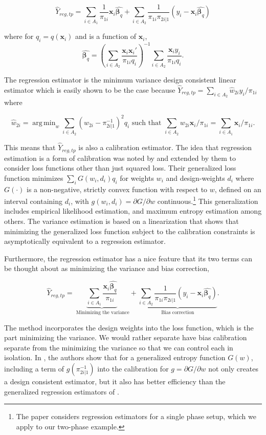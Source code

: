 \documentclass[12pt]{article}
\DeclareMathOperator*{\argmin}{arg\,min}
\renewcommand{\bf}[1]{\mathbf{#1}}
\begin{document}
$$ \hat Y_{reg, tp} 
= \sum_{i \in A_1} \frac{1}{\pi_{1i}} \bf x_i \hat{\bm \beta_q} + 
\sum_{i \in A_2} \frac{1}{\pi_{1i}\pi_{2i|1}} (y_i - \bf x_i \hat{\bm \beta_q})$$

where for $q_i = q(\bf x_i)$ and is a function of $\bf x_i$,
$$
\hat{\bm \beta_q} = \left(\sum_{i \in A_2} 
  \frac{\bf x_i \bf x_i'}{\pi_{1i} q_i}\right)^{-1} 
\sum_{i \in A_2} \frac{\bf x_i y_i}{\pi_{1i} q_i}.$$ 

The regression estimator is the minimum variance design consistent linear
estimator which is easily shown to be the case because $\hat Y_{reg, tp} =
\sum_{i \in A_2} \hat w_{2i} y_i / \pi_{1i}$ where 

$$\hat w_{2i} = \argmin_{w} \sum_{i \in A_2} (w_{2i} - \pi_{2i|1}^{-1})^2 q_i
\text{ such that } \sum_{i \in A_2} w_{2i} \bf x_i / \pi_{1i} = \sum_{i \in A_1}
\bf x_i / \pi_{1i}.$$

This means that $\hat Y_{reg, tp}$ is also a calibration estimator. The idea
that regression estimation is a form of calibration was noted by
\cite{deville1992calibration} and extended by them to consider loss functions
other than just squared loss. Their generalized loss function minimizes
$\sum_i G(w_i, d_i)q_i$ for weights $w_i$ and design-weights $d_i$ where
$G(\cdot)$ is a non-negative, strictly convex function with respect to $w$,
defined on an interval containing $d_i$, with $g(w_i, d_i) = \partial G /
\partial w$ continuous.\footnote{The \cite{deville1992calibration} paper
considers regression estimators for a single phase setup, which we apply to our
two-phase example.} This
generalization includes empirical likelihood estimation, and maximum entropy
estimation among others. The variance estimation is based on a linearization
that shows that minimizing the generalized loss function subject to the
calibration constraints is asymptotically equivalent to a regression estimator.

Furthermore, the regression estimator
has a nice feature that its two terms can be thought about as minimizing the
variance and bias correction,

$$ \hat Y_{reg, tp} 
= \underbrace{\sum_{i \in A_1} \frac{\bf x_i \hat{\bm \beta_q}}{\pi_{1i}}}_{
  \text{ Minimizing the variance}} + \underbrace{\sum_{i \in A_2}
\frac{1}{\pi_{1i}\pi_{2i|1}} (y_i - \bf x_i \hat{\bm \beta_q})}_{
\text{Bias correction}}.$$

The \cite{deville1992calibration} method incorporates the design weights into
the loss function, which is the part minimizing the variance. We would rather
separate have bias calibration separate from the minimizing the variance so that
we can control each in isolation. In
\cite{kwon2024debiased}, the authors show that for a generalized entropy
function $G(w)$, including a term of $g(\pi_{2i|1}^{-1})$ into the calibration
for $g = \partial G / \partial w$ not only creates a design consistent
estimator, but it also has better efficiency than the generalized regression
estimators of \cite{deville1992calibration}.
\end{document}
